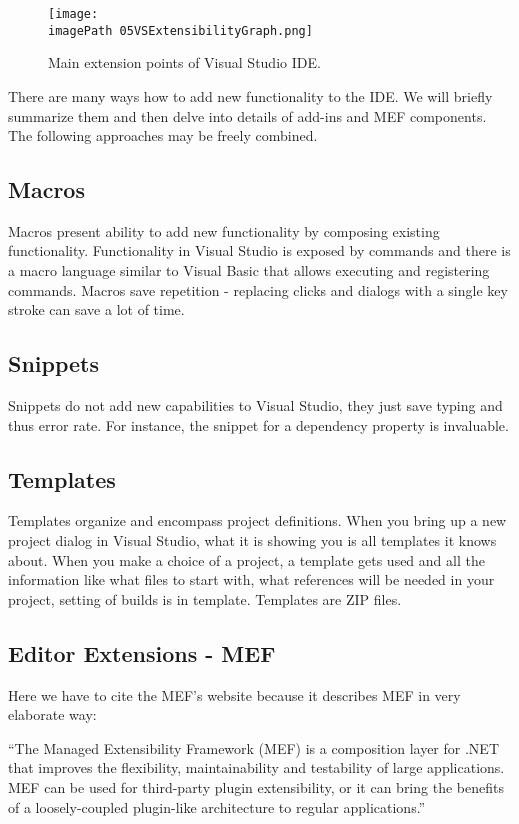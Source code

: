  \begin{figure}
	\centering
		\texttt{[image: \\imagePath 05VSExtensibilityGraph.png]}
		\caption{Main extension points of Visual Studio IDE. }
	\label{fig:05VSExtensibilityGraph}
\end{figure}

There are many ways how to add new functionality to the IDE. We will briefly summarize them and then delve into details of add-ins and MEF components. The following approaches may be freely combined.

\subsection{Macros}
Macros present ability to add new functionality by composing existing functionality. Functionality in Visual Studio is exposed by commands and  there is a macro language similar to Visual Basic  that allows executing and registering commands. Macros save repetition - replacing clicks and dialogs with a single key stroke can save a lot of time.

\subsection{Snippets}
Snippets do not add new capabilities to Visual Studio, they just save typing and thus error rate. For instance, the snippet for a dependency property is invaluable.

\subsection{Templates}
Templates organize and encompass project definitions. When you bring up a new project dialog in Visual Studio, what it is showing you is all templates it knows about. When you make a choice of a project, a template gets used and all the information like what files to start with, what references will be needed in your project, setting of builds is in template. Templates are ZIP files.

\subsection{Editor Extensions - MEF}
Here we have to cite the MEF's website because it describes MEF in very elaborate way:

``The Managed Extensibility Framework (MEF) is a composition layer for .NET that improves the flexibility, maintainability and testability of large applications. MEF can be used for third-party plugin extensibility, or it can bring the benefits of a loosely-coupled plugin-like architecture to regular applications.''\cite{MEFpage}


